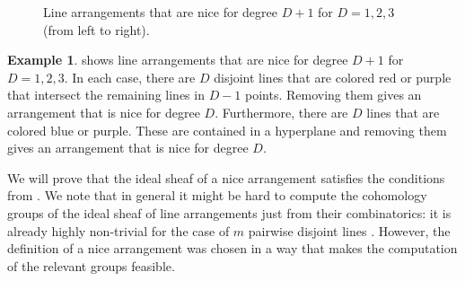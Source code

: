 \documentclass[a4paper,10pt]{amsart}
\theoremstyle{definition}
\newtheorem{ex}[Def]{Example}
\theoremstyle{plain}
\begin{document}
\begin{figure}
\hspace{1cm}
\hspace{1cm}
    \caption{Line arrangements that are nice for degree $D+1$ for $D=1,2,3$ (from left to right).}
    \label{fig:arrangements}
\end{figure}  

\begin{ex}
     shows line arrangements that are nice for degree $D+1$ for $D=1,2,3$. In each case, there are $D$ disjoint lines that are colored red or purple that intersect the remaining lines in $D-1$ points. Removing them gives an arrangement that is nice for degree $D$. Furthermore, there are $D$ lines that are colored blue or purple. These are contained in a hyperplane and removing them gives an arrangement that is nice for degree $D$.
\end{ex}

We will prove that the ideal sheaf of a nice arrangement satisfies the conditions from . We note that in general it might be hard to compute the cohomology groups of the ideal sheaf of line arrangements just from their combinatorics: it is already highly non-trivial for the case of $m$ pairwise disjoint lines \cite{HartshorneHirschowitz}. However, the definition of a nice arrangement was chosen in a way that makes the computation of the relevant groups feasible.
\end{document}
